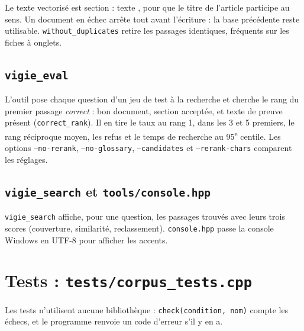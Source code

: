 \documentclass[11pt,a4paper]{article}
\newcommand{\fichier}[1]{\texttt{#1}}
\begin{document}


Le texte vectorisé est \og section : texte \fg, pour que le titre de l'article participe au sens. Un document en échec arrête tout avant l'écriture : la base précédente reste utilisable. \texttt{without\_duplicates} retire les passages identiques, fréquents sur les fiches à onglets.

\subsection{\texttt{vigie\_eval}}

L'outil pose chaque question d'un jeu de test à la recherche et cherche le rang du premier passage \emph{correct} : bon document, section acceptée, et texte de preuve présent (\texttt{correct\_rank}). Il en tire le taux au rang 1, dans les 3 et 5 premiers, le rang réciproque moyen, les refus et le temps de recherche au 95\textsuperscript{e} centile. Les options \texttt{--no-rerank}, \texttt{--no-glossary}, \texttt{--candidates} et \texttt{--rerank-chars} comparent les réglages.

\subsection{\texttt{vigie\_search} et \texttt{tools/console.hpp}}

\fichier{vigie\_search} affiche, pour une question, les passages trouvés avec leurs trois scores (couverture, similarité, reclassement). \fichier{console.hpp} passe la console Windows en UTF-8 pour afficher les accents.

\section{Tests : \texttt{tests/corpus\_tests.cpp}}

Les tests n'utilisent aucune bibliothèque : \texttt{check(condition, nom)} compte les échecs, et le programme renvoie un code d'erreur s'il y en a.
\end{document}
